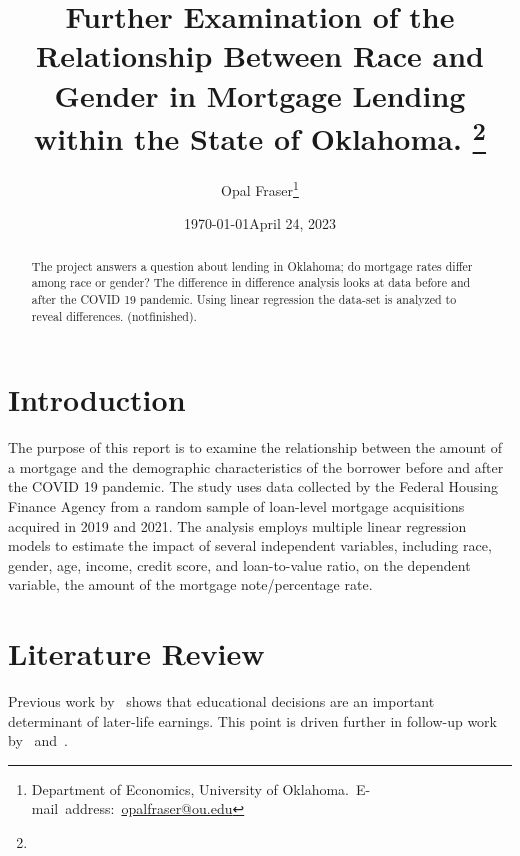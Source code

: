 \documentclass[12pt,english]{article}
\begin{document}
\begin{singlespace}
\title{Further Examination of the Relationship Between Race and Gender in Mortgage Lending within the State of Oklahoma. \thanks{}}
\end{singlespace}

\author{Opal Fraser\thanks{Department of Economics, University of Oklahoma.\
E-mail~address:~\href{mailto:opalfraser@ou.edu}{opalfraser@ou.edu}}}

\date{\today}
\date{April 24, 2023}

\maketitle

\begin{abstract}
\begin{singlespace}
The project answers a question about lending in Oklahoma; do mortgage rates differ among race or gender? The difference in difference analysis looks at data before and after the COVID 19 pandemic. Using linear regression the data-set is analyzed to reveal differences. (notfinished). 

\end{singlespace}

\end{abstract}
\vfill{}

\pagebreak{}

\section{Introduction}\label{sec:intro}
The purpose of this report is to examine the relationship between the amount of a mortgage and the demographic characteristics of the borrower before and after the COVID 19 pandemic. The study uses data collected by the Federal Housing Finance Agency from a random sample of loan-level mortgage acquisitions acquired in 2019 and 2021. The analysis employs multiple linear regression models to estimate the impact of several independent variables, including race, gender, age, income, credit score, and loan-to-value ratio, on the dependent variable, the amount of the mortgage note/percentage rate.


\section{Literature Review}\label{sec:litreview}
Previous work by~\cite{gupta2022financial} shows that educational decisions are an important determinant of later-life earnings. This point is driven further in follow-up work by~\cite{gupta2022financial} and~\cite{gupta2022financial}.
\end{document}
